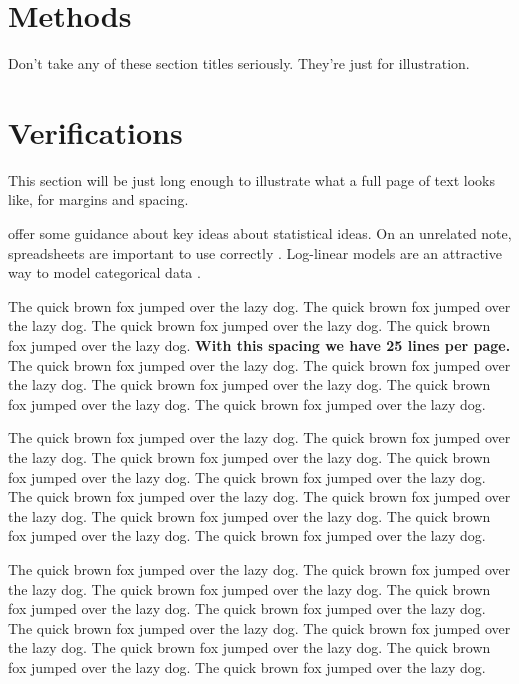 \documentclass[
  12pt]{article}
\begin{document}
\section{Methods}\label{sec-meth}

Don't take any of these section titles seriously. They're just for
illustration.

\section{Verifications}\label{sec-verify}

This section will be just long enough to illustrate what a full page of
text looks like, for margins and spacing.

\addtolength{\textheight}{.5in}%

\citet{gelm:veht:2021} offer some guidance about key ideas about
statistical ideas. On an unrelated note, spreadsheets are important to
use correctly \citep{brom:woo:2018}. Log-linear models are an attractive
way to model categorical data \citep{bish:fien:1975}.

The quick brown fox jumped over the lazy dog. The quick brown fox jumped
over the lazy dog. The quick brown fox jumped over the lazy dog. The
quick brown fox jumped over the lazy dog. \textbf{With this spacing we
have 25 lines per page.} The quick brown fox jumped over the lazy dog.
The quick brown fox jumped over the lazy dog. The quick brown fox jumped
over the lazy dog. The quick brown fox jumped over the lazy dog. The
quick brown fox jumped over the lazy dog.

The quick brown fox jumped over the lazy dog. The quick brown fox jumped
over the lazy dog. The quick brown fox jumped over the lazy dog. The
quick brown fox jumped over the lazy dog. The quick brown fox jumped
over the lazy dog. The quick brown fox jumped over the lazy dog. The
quick brown fox jumped over the lazy dog. The quick brown fox jumped
over the lazy dog. The quick brown fox jumped over the lazy dog. The
quick brown fox jumped over the lazy dog.

The quick brown fox jumped over the lazy dog. The quick brown fox jumped
over the lazy dog. The quick brown fox jumped over the lazy dog. The
quick brown fox jumped over the lazy dog. The quick brown fox jumped
over the lazy dog. The quick brown fox jumped over the lazy dog. The
quick brown fox jumped over the lazy dog. The quick brown fox jumped
over the lazy dog. The quick brown fox jumped over the lazy dog. The
quick brown fox jumped over the lazy dog.
\end{document}
